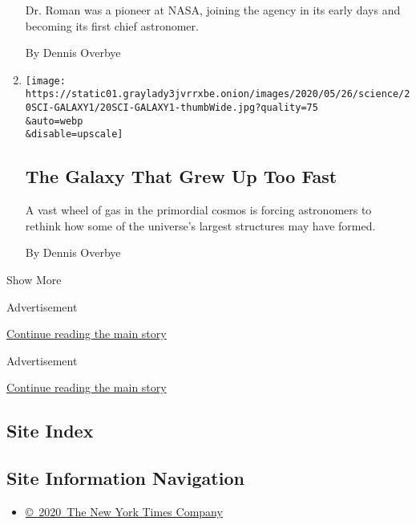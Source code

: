 \begin{enumerate}
  Dr. Roman was a pioneer at NASA, joining the agency in its early days
  and becoming its first chief astronomer.

  By Dennis Overbye
\item
  \href{/2020/05/20/science/galaxy-early-universe-astronomy.html}{}

  \texttt{[image: https://static01.graylady3jvrrxbe.onion/images/2020/05/26/science/20SCI-GALAXY1/20SCI-GALAXY1-thumbWide.jpg?quality=75\\\&auto=webp\\\&disable=upscale]}

  \hypertarget{the-galaxy-that-grew-up-too-fast}{%
  \subsection{The Galaxy That Grew Up Too
  Fast}\label{the-galaxy-that-grew-up-too-fast}}

  A vast wheel of gas in the primordial cosmos is forcing astronomers to
  rethink how some of the universe's largest structures may have formed.

  By Dennis Overbye
\end{enumerate}

Show More

Advertisement

\protect\hyperlink{after-mid1}{Continue reading the main story}

Advertisement

\protect\hyperlink{after-mktg}{Continue reading the main story}

\hypertarget{site-index}{%
\subsection{Site Index}\label{site-index}}

\hypertarget{site-information-navigation}{%
\subsection{Site Information
Navigation}\label{site-information-navigation}}

\begin{itemize}
\tightlist
\item
  \href{https://help.nytimes3xbfgragh.onion/hc/en-us/articles/115014792127-Copyright-notice}{©~2020~The
  New York Times Company}
\end{itemize}

